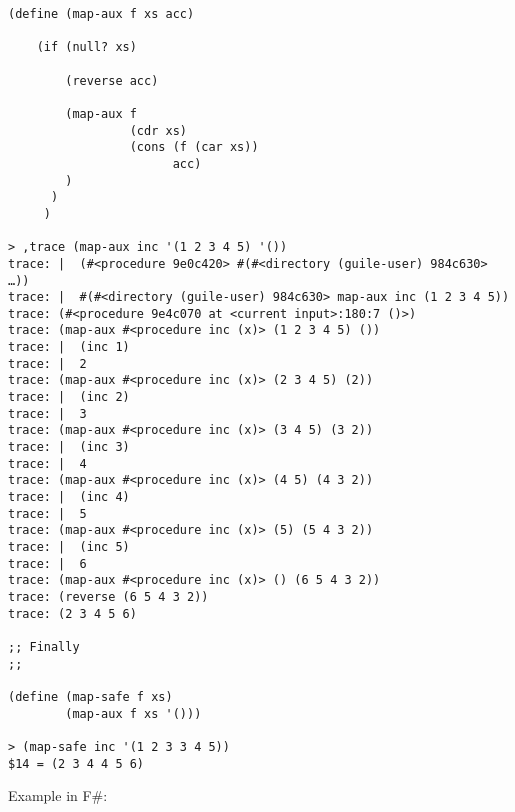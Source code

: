 \documentclass[11pt]{article}
\begin{document}
\begin{verbatim}
(define (map-aux f xs acc) 

    (if (null? xs)

        (reverse acc)

        (map-aux f 
                 (cdr xs)
                 (cons (f (car xs)) 
                       acc)
        )
      )
     ) 
 
> ,trace (map-aux inc '(1 2 3 4 5) '())
trace: |  (#<procedure 9e0c420> #(#<directory (guile-user) 984c630> …))
trace: |  #(#<directory (guile-user) 984c630> map-aux inc (1 2 3 4 5))
trace: (#<procedure 9e4c070 at <current input>:180:7 ()>)
trace: (map-aux #<procedure inc (x)> (1 2 3 4 5) ())
trace: |  (inc 1)
trace: |  2
trace: (map-aux #<procedure inc (x)> (2 3 4 5) (2))
trace: |  (inc 2)
trace: |  3
trace: (map-aux #<procedure inc (x)> (3 4 5) (3 2))
trace: |  (inc 3)
trace: |  4
trace: (map-aux #<procedure inc (x)> (4 5) (4 3 2))
trace: |  (inc 4)
trace: |  5
trace: (map-aux #<procedure inc (x)> (5) (5 4 3 2))
trace: |  (inc 5)
trace: |  6
trace: (map-aux #<procedure inc (x)> () (6 5 4 3 2))
trace: (reverse (6 5 4 3 2))
trace: (2 3 4 5 6)

;; Finally 
;; 

(define (map-safe f xs)
        (map-aux f xs '()))

> (map-safe inc '(1 2 3 3 4 5))
$14 = (2 3 4 4 5 6)
\end{verbatim}

Example in F\#:
\end{document}
